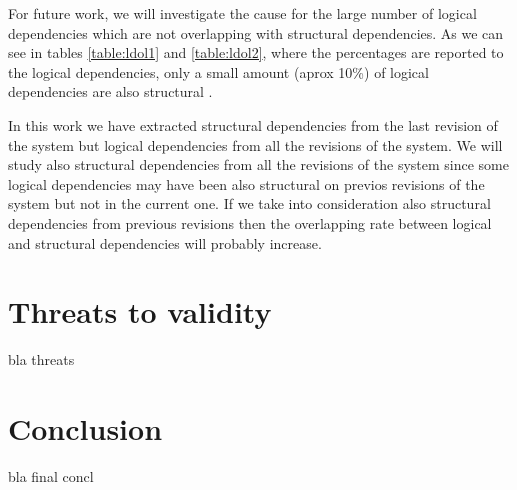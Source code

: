 \documentclass[conference]{IEEEtran}
\begin{document}
For future work, we will investigate the cause for the large number of logical dependencies which are not overlapping with structural dependencies. As we can see in tables \ref{table:ldol1} and \ref{table:ldol2}, where the percentages are reported to the logical dependencies, only a small amount (aprox 10\%) of logical dependencies are also structural .

 In this work we have extracted structural dependencies from the last revision of the system but logical dependencies from all the revisions of the system. We will study also structural dependencies from all the revisions of the system since some logical dependencies may have been also structural on previos revisions of the system but not in the current one. If we take into consideration also structural dependencies from previous revisions then the overlapping rate between logical and structural dependencies will probably increase.



\section {Threats to validity}
\label{sec:validity}


bla threats

\section{Conclusion}
\label{sec:Conclusion}
   
	
bla final concl




%



\end{document}
